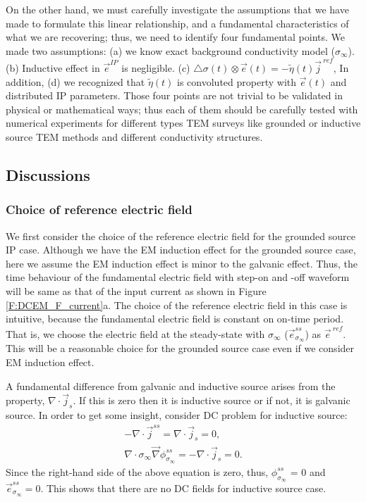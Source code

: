 \documentclass[a4paper, 11pt]{article}
\renewcommand{\div}{\nabla\cdot}
\newcommand{\grad}{\vec \nabla}
\newcommand{\siginf}{\sigma_\infty}
\newcommand{\dsig}{\triangle\sigma}
\renewcommand {\j}  { {\vec j} }
\newcommand {\e}  { {\vec e} }
\newcommand{\peta}{\tilde{\eta}}
\begin{document}
On the other hand, we must carefully investigate the assumptions that we have made to formulate this linear relationship, and a fundamental characteristics of what we are recovering; thus, we need to identify four fundamental points. We made two assumptions: (a) we know exact background conductivity model ($\siginf$). (b) Inductive effect in $\e^{IP}$ is negligible. (c) $\dsig(t)\otimes \e(t) = -\peta(t)\j^{\ ref}$, In addition, (d) we recognized that $\peta(t)$ is convoluted property with $\e(t)$ and distributed IP parameters. Those four points are not trivial to be validated in physical or mathematical ways; thus each of them should be carefully tested with numerical experiments for different types TEM surveys like grounded or inductive source TEM methods and different conductivity structures.

\subsection{Discussions}
\subsubsection{Choice of reference electric field}
We first consider the choice of the reference electric field for the grounded source IP case. Although we have the EM induction effect for the grounded source case, here we assume the EM induction effect is minor to the galvanic effect. Thus, the time behaviour of the fundamental electric field with step-on and -off waveform will be same as that of the input current as shown in Figure \ref{F:DCEM_F_current}a. The choice of the reference electric field in this case is intuitive, because the fundamental electric field is constant on on-time period. That is, we choose the electric field at the steady-state with $\siginf$ ($\e^{ss}_{\siginf}$) as $\e^{\ ref}$. This will be a reasonable choice for the grounded source case even if we consider EM induction effect. 

A fundamental difference from galvanic and inductive source arises from the property, $\div\j_s$.  If this is zero then it is inductive source or if not, it is galvanic source. In order to get some insight, consider DC problem for inductive source:
\begin{eqnarray*}
    -\div\j^{ss} = \div\j_s = 0, \\
    \div \siginf \grad \phi^{ss}_{\siginf} = -\div\j_s = 0.
\end{eqnarray*}
Since the right-hand side of the above equation is zero, thus, $\phi^{ss}_{\siginf}$ = 0 and $\e^{ss}_{\siginf}=0$. This shows that there are no DC fields for inductive source case. 
\end{document}
